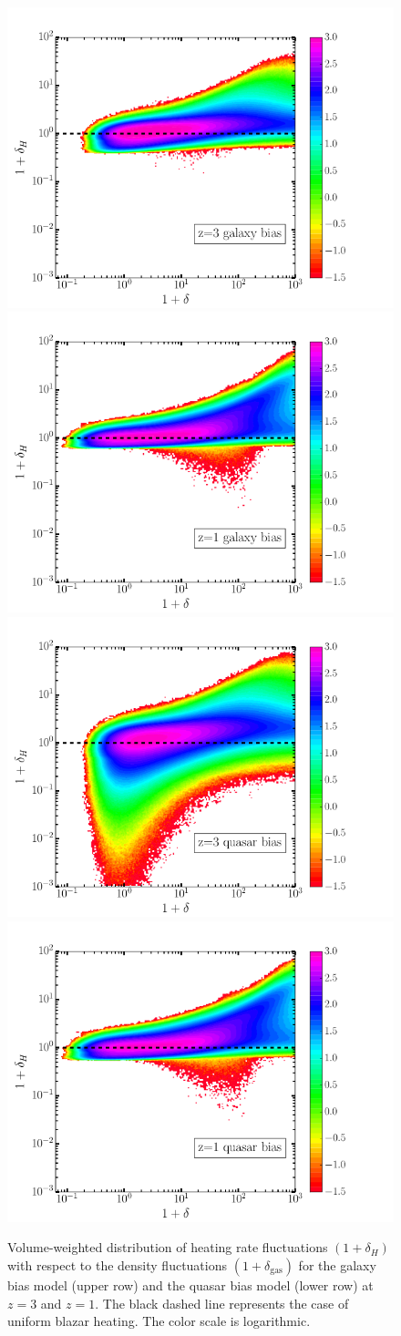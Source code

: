 \documentclass[numberedappendix]{emulateapj}
\begin{document}
\begin{figure}[h]
\centering
\includegraphics[width = .45\textwidth ]{delta_deltah_z3_gal2_ok.png}
\includegraphics[width = .45\textwidth ]{delta_deltah_z1_gal2_ok.png}\\
\includegraphics[width = .45\textwidth ]{delta_deltah_z3_qso4_512b.png}
\includegraphics[width = .45\textwidth ]{delta_deltah_z1_qso4_512b.png}
\caption{Volume-weighted distribution of heating rate fluctuations $(1+\delta_H)$ with respect to the density fluctuations $(1+\delta_{\mathrm{gas}})$ for the galaxy bias model (upper row) and the quasar bias model (lower row) at $z=3$ and $z=1$. The black dashed line represents the case of uniform blazar heating. The color scale is logarithmic.}
\label{fig:deltas}
\end{figure}
\end{document}
